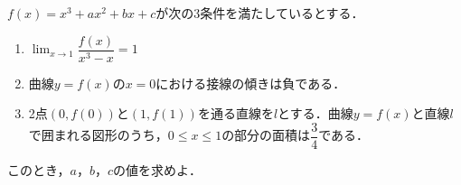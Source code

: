 \documentclass[../../main.tex]{subfiles}
\begin{document}
$f(x)=x^3+ax^2+bx+c$が次の3条件を満たしているとする．
\begin{enumerate}
  \item ${\displaystyle \lim_{x\to 1}\dfrac{f(x)}{x^3-x}= 1}$
  \item 曲線$y=f(x)$の$x=0$における接線の傾きは負である．
  \item 2点$(0,f(0))$と$(1,f(1))$を通る直線を$l$とする．曲線$y=f(x)$と直線$l$で囲まれる図形のうち，$0\le x\le 1$の部分の面積は$\dfrac{3}{4}$である．
\end{enumerate}
このとき，$a$，$b$，$c$の値を求めよ．
\end{document}
